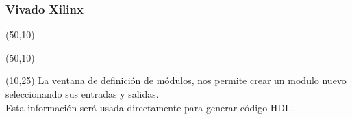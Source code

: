 \documentclass[aspectratio=169]{beamer}
\begin{document}
\begin{frame}[fragile,t]
    \frametitle{Vivado Xilinx}
    \begin{textblock}{75}(50,10)  \end{textblock}
    \begin{textblock}{75}(50,10)  \end{textblock}
    \begin{textblock}{38}(10,25) \small
    La ventana de definición de módulos, nos permite crear un modulo nuevo seleccionando sus entradas y salidas.\\
    \textcolor{verdeuca}{Esta información será usada directamente para generar código HDL.}
    \end{textblock}
\end{frame}
    
\end{document}
